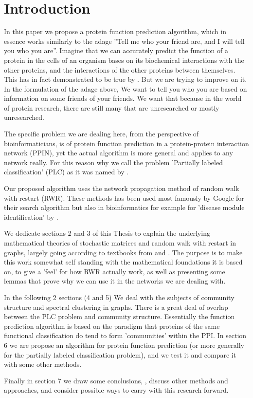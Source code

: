 \section{Introduction}

In this paper we propose a protein function prediction algorithm,
which in essence works similarly to the adage ''Tell me who your
friend are, and I will tell you who you are''. Imagine that we can
accurately predict the function of a protein in the cells of an
organism bases on its biochemical interactions with the other
proteins, and the interactions of the other proteins between
themselves. This has in fact demonstrated to be true by
\textcite{schwikowski2000network}. But we are trying to improve on
it. In the formulation of the adage above, We want to tell you who
you are based on information on some friends of your friends. 
We want that because in the world of protein research, there are
still many that are unresearched or mostly unresearched.

The specific problem we are dealing here, from the perspective of
bioinformaticians, is of protein function prediction in a
protein-protein interaction network (PPIN), yet the actual algorithm
is more general and applies to any network really. For this reason
why we call the problem 'Partially labeled classification' (PLC) as it was
named by \textcite{szummer2002partially}.

Our proposed algorithm uses the network propagation method of random
walk with restart (RWR). These methods has been used most famously
by Google for their search algorithm but also in bioinformatics  for
example for 'disease module identification' by
\cite{vandin2012discovery, barel2020netcore}.

We dedicate sections 2 and 3 of this Thesis to explain the
underlying mathematical theories of stochastic matrices and random
walk with restart in graphs, largely going according to textbooks
from \textcite{meyer2000matrix} and \textcite{herstein_winter_1989}.
The purpose is to make this work somewhat self standing with the
mathematical foundations it is based on, to give a 'feel' for how
RWR actually work, as well as presenting some
lemmas that prove why we can use it in the networks we are dealing
with.

In the following 2 sections (4 and 5) We deal with the subjects
of community structure and spectral clustering in graphs. There is
a great deal of overlap between the PLC problem and community structure. 
Essentially the function prediction algorithm is based on the
paradigm that proteins of the same functional classification do tend
to form 'communities' within the PPI.
In section 6 we are propose an algorithm for protein function
prediction (or more generally for the partially labeled
classification problem), and we test it and compare it with some
other methods. 

Finally in section 7 we draw some conclusions, , discuss other
methods and approaches, and consider possible ways to carry with
this research forward.
